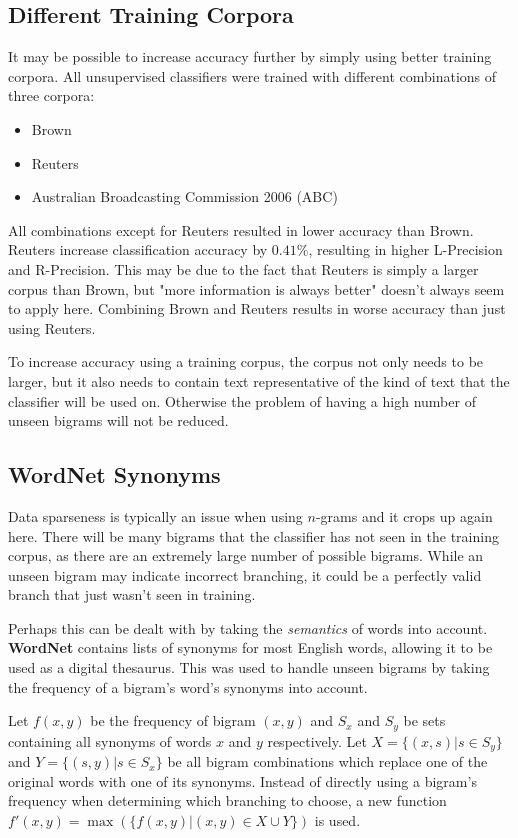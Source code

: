 \documentclass{article}
\begin{document}
\subsection{Different Training Corpora}
\label{sec:diff_corpora}

It may be possible to increase accuracy further by simply using better training corpora. All unsupervised classifiers were trained with different combinations of three corpora:
\begin{itemize}
	\item Brown
	\item Reuters
	\item Australian Broadcasting Commission 2006 (ABC)
\end{itemize}

All combinations except for Reuters resulted in lower accuracy than Brown. Reuters increase classification accuracy by $0.41\%$, resulting in higher L-Precision and R-Precision. This may be due to the fact that Reuters is simply a larger corpus than Brown, but "more information is always better" doesn't always seem to apply here. Combining Brown and Reuters results in worse accuracy than just using Reuters.

To increase accuracy using a training corpus, the corpus not only needs to be larger, but it also needs to contain text representative of the kind of text that the classifier will be used on. Otherwise the problem of having a high number of unseen bigrams will not be reduced.

\subsection{WordNet Synonyms}
\label{sec:wordnet_synonyms}

Data sparseness is typically an issue when using $n$-grams and it crops up again here. There will be many bigrams that the classifier has not seen in the training corpus, as there are an extremely large number of possible bigrams. While an unseen bigram may indicate incorrect branching, it could be a perfectly valid branch that just wasn't seen in training.

Perhaps this can be dealt with by taking the \textit{semantics} of words into account. \textbf{WordNet} contains lists of synonyms for most English words, allowing it to be used as a digital thesaurus. This was used to handle unseen bigrams by taking the frequency of a bigram's word's synonyms into account.

Let $f(x, y)$ be the frequency of bigram $(x, y)$ and $S_x$ and $S_y$ be sets containing all synonyms of words $x$ and $y$ respectively. Let $X = \lbrace (x, s) | s \in S_y \rbrace$ and $Y = \lbrace (s, y) | s \in S_x \rbrace$ be all bigram combinations which replace one of the original words with one of its synonyms. Instead of directly using a bigram's frequency when determining which branching to choose, a new function $f'(x, y) = \max(\lbrace f(x, y) | (x, y) \in X \cup Y \rbrace)$ is used.
\end{document}
